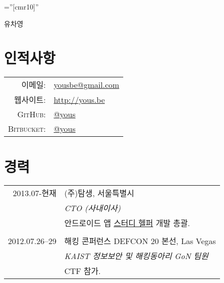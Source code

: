 \documentclass[a4paper,10pt]{article}
\begin{document}

\pagestyle{empty} %

\font\fb=''[cmr10]'' %

\par{\centering
{\Huge 유차영
}\bigskip\par}

\section{인적사항}

\begin{tabular}{rl}
  \textsc{이메일:}    & \href{mailto:yousbe@gmail.com}{yousbe@gmail.com} \\
  \textsc{웹사이트:}  & \url{http://yous.be} \\
  \textsc{GitHub:}    & \href{https://github.com/yous}{@yous} \\
  \textsc{Bitbucket:} & \href{https://bitbucket.org/yous}{@yous}
\end{tabular}

\section{경력}
\begin{tabular}{r|p{11cm}}
  \textsc{2013.07-현재} & \textsc{(주)탐생}, 서울특별시 \\
  & \emph{CTO (사내이사)} \\
  & 안드로이드 앱 \href{https://play.google.com/store/apps/details?id=kr.co.tamseng.StudyHelper}{스터디 헬퍼} 개발 총괄. \\
  \multicolumn{2}{c}{} \\

  \textsc{2012.07.26--29} & \textsc{해킹 콘퍼런스 DEFCON 20 본선}, Las Vegas \\
  & \emph{KAIST 정보보안 및 해킹동아리 GoN 팀원} \\
  & CTF 참가.
\end{tabular}
\end{document}
